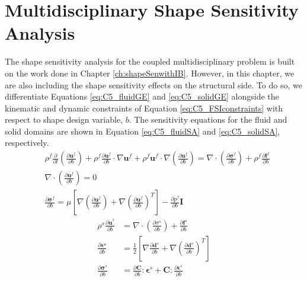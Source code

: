 \section{Multidisciplinary Shape Sensitivity Analysis}
The shape sensitivity analysis for the coupled multidisciplinary problem is built on the work done in Chapter \ref{ch:shapeSenwithIB}. However, in this chapter, we are also including the shape sensitivity effects on the structural side. To do so, we differentiate Equations \eqref{eq:C5_fluidGE} and \eqref{eq:C5_solidGE} alongside the kinematic and dynamic constraints of Equation \eqref{eq:C5_FSIconstraints} with respect to shape design variable, $b$. The sensitivity equations for the fluid and solid domains are shown in Equation \eqref{eq:C5_fluidSA} and \eqref{eq:C5_solidSA}, respectively.
%
\begin{subequations}\label{eq:C5_fluidSA}
\begin{align}
	&\rho^f \frac{\partial}{\partial t} \left( \frac{\partial \mathbf{u}^f}{\partial b} \right) + 
	\rho^f \frac{\partial \mathbf{u}^f}{\partial b} \cdot \nabla \mathbf{u}^f +
	\rho^f \mathbf{u}^f \cdot \nabla \left( \frac{\partial \mathbf{u}^f}{\partial b} \right) = 
	\nabla \cdot \left( \frac{\partial \mathbf{\sigma}^f}{\partial b} \right) +
	\rho^f \frac{\partial \mathbf{f}^f}{\partial b}
	\\
	&\nabla \cdot \left( \frac{\partial \mathbf{u}^f}{\partial b} \right) = 0
	\\
	&\frac{\partial \mathbf{\sigma}^f}{\partial b} = 
	\mu \left[ \nabla \left( \frac{\partial \mathbf{u}^f}{\partial b} \right) + 
	           \nabla \left( \frac{\partial \mathbf{u}^f}{\partial b} \right)^T \right] - 
	\frac{\partial p^f}{\partial b} \mathbf{I}
\end{align}
\end{subequations}
%
\begin{subequations}\label{eq:C5_solidSA}
\begin{align}
	\rho^s \frac{\partial \dot{\mathbf{u}}^s}{\partial b} &= 
	\nabla \cdot \left( \frac{\partial \sigma^s}{\partial b} \right) + 
	\frac{\partial \mathbf{f}^s}{\partial b}
	\\
	\frac{\partial \mathbf{\epsilon^s}}{\partial b} &=
	\frac{1}{2}
	\left[ \nabla \frac{\partial \mathbf{d}^s}{\partial b} + \nabla \left( \frac{\partial \mathbf{d}^s}{\partial b} \right)^T \right]
	\\
	\frac{\partial \mathbf{\sigma}^s}{\partial b} &= 
	\frac{\partial \mathbf{C}}{\partial b} : \mathbf{\epsilon}^s + 
	\mathbf{C} : \frac{\partial \mathbf{\epsilon}^s}{\partial b}
\end{align}
\end{subequations}

